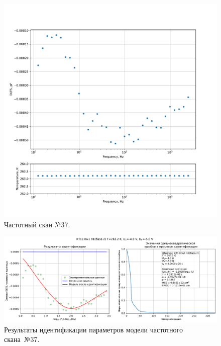 \begin{figure}[!ht]
    \centering
    \includegraphics[width=1\textwidth]{../plots/КТ117№1_п1(база 2)_2500Гц-1Гц_1пФ_-10С_-4В-5В_20мВ_20мкс_шаг_0,1.pdf}
    \caption{Частотный скан №37.}
    \label{pic:frequency_scan_37}
\end{figure}

\begin{figure}[!ht]
    \centering
    \includegraphics[width=1\textwidth]{../plots/КТ117№1_п1(база 2)_2500Гц-1Гц_1пФ_-10С_-4В-5В_20мВ_20мкс_шаг_0,1_model.pdf}
    \caption{Результаты идентификации параметров модели частотного скана~№37.}
    \label{pic:frequency_scan_model37}
\end{figure}

\pagebreak


